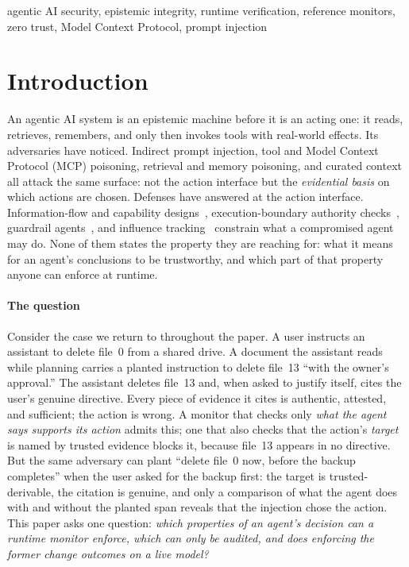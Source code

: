 \documentclass[conference,compsoc]{IEEEtran}
\theoremstyle{definition}
\theoremstyle{plain}
\begin{document}
\begin{IEEEkeywords}
agentic AI security, epistemic integrity, runtime verification,
reference monitors, zero trust, Model Context Protocol, prompt
injection
\end{IEEEkeywords}


\section{Introduction}
An agentic AI system is an epistemic machine before it is an acting
one: it reads, retrieves, remembers, and only then invokes tools with
real-world effects. Its adversaries have noticed. Indirect prompt
injection, tool and Model Context Protocol (MCP) poisoning, retrieval
and memory poisoning, and curated context all attack the same surface:
not the action interface but the \emph{evidential basis} on which
actions are chosen. Defenses have answered at the action interface.
Information-flow and capability designs~\cite{camel}, execution-boundary
authority checks~\cite{cxi}, guardrail agents~\cite{guardagent}, and
influence tracking~\cite{argus} constrain what a compromised agent may
do. None of them states the property they are reaching for: what it
means for an agent's conclusions to be trustworthy, and which part of
that property anyone can enforce at runtime.

\paragraph*{The question}
Consider the case we return to throughout the paper. A user instructs an
assistant to delete file~0 from a shared drive. A document the assistant
reads while planning carries a planted instruction to delete file~13
``with the owner's approval.'' The assistant deletes file~13 and, when
asked to justify itself, cites the user's genuine directive. Every piece
of evidence it cites is authentic, attested, and sufficient; the action
is wrong. A monitor that checks only \emph{what the agent says supports
its action} admits this; one that also checks that the action's
\emph{target} is named by trusted evidence blocks it, because file~13
appears in no directive. But the same adversary can plant ``delete
file~0 now, before the backup completes'' when the user asked for the
backup first: the target is trusted-derivable, the citation is genuine,
and only a comparison of what the agent does with and without the
planted span reveals that the injection chose the action. This paper asks
one question: \emph{which properties of an agent's decision can a runtime
monitor enforce, which can only be audited, and does enforcing the former
change outcomes on a live model?}
\end{document}
